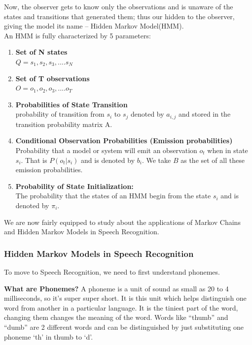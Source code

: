 \documentclass[10pt,twocolumn,letterpaper]{article}
\begin{document}
Now, the observer gets to know only the observations and is unaware of the states and transitions that generated them; thus our hidden to the observer, giving the model its name – Hidden Markov Model(HMM). \\

An HMM is fully characterized by 5 parameters: 
\begin{enumerate}
    \item \textbf{Set of N states}\\
    $Q = s_1, s_2, s_3, .... s_N$
    \item \textbf{Set of T observations} \\
    $O = o_1, o_2, o_3,.... o_T$
    \item \textbf{Probabilities of State Transition}\\
    probability of transition from $s_i$ to $s_j$ denoted by $a_{i,j}$ and stored in the transition probability matrix A.
    \item \textbf{Conditional Observation Probabilities (Emission probabilities) } \\
    Probability that a model or system will emit an observation $o_t$ when in state $s_i$. That is $P(o_t | s_i)$ and is denoted by $b_{i}$. We take $B$ as the set of all these emission probabilities.
    \item \textbf{Probability of State Initialization:} \\
    The probability that the states of an HMM begin from the state $s_i$ and is denoted by $\pi_i$.
\end{enumerate}

We are now fairly equipped to study about the applications of Markov Chains and Hidden Markov Models in Speech Recognition. 


\subsubsection{Hidden Markov Models in Speech Recognition}
To move to Speech Recognition, we need to first understand phonemes.


\textbf{What are Phonemes?}
A phoneme is a unit of sound as small as 20 to 4 milliseconds, so it’s super super short. It is this unit which helps distinguish one word from another in a particular language. It is the tiniest part of the word, changing them changes the meaning of the word. Words like “thumb” and “dumb” are 2 different words and can be distinguished by just substituting one phoneme ‘th’ in thumb to ‘d’. \\
\end{document}
